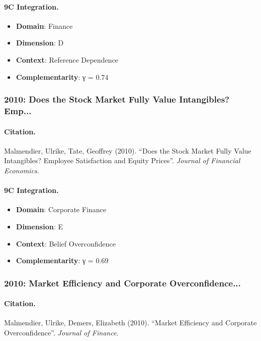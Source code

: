 \paragraph{9C Integration.}
\begin{itemize}[nosep]
  \item \textbf{Domain}: Finance
  \item \textbf{Dimension}: D
  \item \textbf{Context}: Reference Dependence
  \item \textbf{Complementarity}: γ = 0.74
\end{itemize}


\subsubsection{2010: Does the Stock Market Fully Value Intangibles? Emp...}

\paragraph{Citation.}
Malmendier, Ulrike, Tate, Geoffrey (2010). ``Does the Stock Market Fully Value Intangibles? Employee Satisfaction and Equity Prices''. \textit{Journal of Financial Economics}.

\paragraph{9C Integration.}
\begin{itemize}[nosep]
  \item \textbf{Domain}: Corporate Finance
  \item \textbf{Dimension}: E
  \item \textbf{Context}: Belief Overconfidence
  \item \textbf{Complementarity}: γ = 0.69
\end{itemize}


\subsubsection{2010: Market Efficiency and Corporate Overconfidence...}

\paragraph{Citation.}
Malmendier, Ulrike, Demers, Elizabeth (2010). ``Market Efficiency and Corporate Overconfidence''. \textit{Journal of Finance}.

